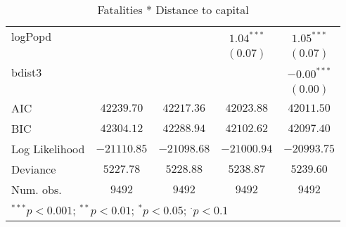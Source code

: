 \begin{sidewaystable}
\begin{center}
{\begin{tabular}{l c c c c}
logPopd              &               &                 & $1.04^{***}$  & $1.05^{***}$  \\
                     &               &                 & $(0.07)$      & $(0.07)$      \\
bdist3               &               &                 &               & $-0.00^{***}$ \\
                     &               &                 &               & $(0.00)$      \\
\hline
AIC                  & $42239.70$    & $42217.36$      & $42023.88$    & $42011.50$    \\
BIC                  & $42304.12$    & $42288.94$      & $42102.62$    & $42097.40$    \\
Log Likelihood       & $-21110.85$   & $-21098.68$     & $-21000.94$   & $-20993.75$   \\
Deviance             & $5227.78$     & $5228.88$       & $5238.87$     & $5239.60$     \\
Num. obs.            & $9492$        & $9492$          & $9492$        & $9492$        \\
\hline
\multicolumn{5}{l}{\scriptsize{$^{***}p<0.001$; $^{**}p<0.01$; $^{*}p<0.05$; $^{\cdot}p<0.1$}}
\end{tabular}
}
\caption{Fatalities * Distance to capital}
\label{interaction_deaths}
\end{center}
\end{sidewaystable}
